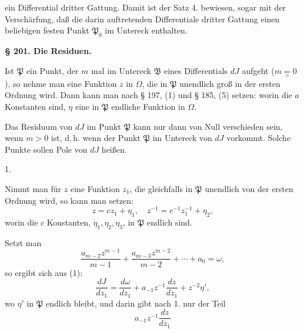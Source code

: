 ein Differential dritter Gattung. Damit ist der Satz 4. bewiesen, sogar mit der Verschärfung, daß die darin auftretenden Differentiale dritter Gattung einen beliebigen festen Punkt $\mathfrak{P}_0$ im Untereck enthalten.

\begin{center}
\textbf{§ 201. Die Residuen.}
\end{center}

Ist $\mathfrak{P}$ ein Punkt, der $m$ mal im Untereck $\mathfrak{B}$ eines Differentials $dJ$ aufgeht ($m \mathrel{\underset{>}{=}} 0$),
so nehme man eine Funktion $z$ in $\Omega$, die in $\mathfrak{P}$ unendlich groß in der ersten Ordnung wird. Dann kann man nach § 197, (1) und § 185, (5) setzen:
worin die $a$ Konstanten sind, $\eta$ eine in $\mathfrak{P}$ endliche Funktion in $\Omega$.


Das Residuum von $dJ$ im Punkt $\mathfrak{P}$ kann nur dann von Null verschieden sein, wenn $m>0$ ist, d.\,h. wenn der Punkt $\mathfrak{P}$ im Untereck von $dJ$ vorkommt. Solche Punkte sollen Pole von $dJ$ heißen.

1. 

Nimmt man für $z$ eine Funktion $z_1$, die gleichfalls in $\mathfrak{P}$ unendlich von der ersten Ordnung wird, so kann man setzen:
\[
z = cz_1 + \eta_1, \quad z^{-1} = c^{-1}z_1^{-1} + \eta_2,
\]
worin die $c$ Konstanten, $\eta_1, \eta_2, \eta_3$, in $\mathfrak{P}$ endlich sind.

Setzt man
\[
\frac{a_{m-2}z^{m-1}}{m-1} + \frac{a_{m-3}z^{m-2}}{m-2} + \cdots + a_0 = \omega,
\]
so ergibt sich aus (1):
\[
\frac{dJ}{dz_1} = \frac{d\omega}{dz_1} + a_{-1}z^{-1}\frac{dz}{dz_1} + z^{-2}\eta',
\]
wo $\eta'$ in $\mathfrak{P}$ endlich bleibt, und darin gibt nach 1. nur der Teil
\[
a_{-1}z^{-1}\frac{dz}{dz_1}
\]
